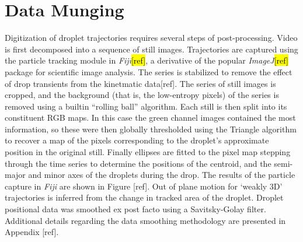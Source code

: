 \documentclass[10pt,a4paper]{article}
\begin{document}
\section{Data Munging}
Digitization of droplet trajectories requires several steps of post-processing. Video is first decomposed into a sequence of still images. Trajectories are captured using the particle tracking module in \emph{Fiji}\hl{[ref]}, a derivative of the popular \emph{ImageJ}\hl{[ref]} package for scientific image analysis. The series is stabilized to remove the effect of drop transients from the kinetmatic data[ref]. The series of still images is cropped, and the background (that is, the low-entropy pixels) of the series is removed using a builtin ``rolling ball'' algorithm. Each still is then split into its constituent RGB maps. In this case the green channel images contained the most information, so these were then globally thresholded using the Triangle algorithm to recover a map of the pixels corresponding to the droplet's approximate position in the original still. Finally ellipses are fitted to the pixel map stepping through the time series to determine the positions of the centroid, and the semi-major and minor axes of the droplets during the drop. The results of the particle capture in \emph{Fiji} are shown in Figure [ref]. Out of plane motion for `weakly 3D' trajectories is inferred from the change in tracked area of the droplet. Droplet positional data was smoothed ex post facto using a Savitsky-Golay filter. Additional details regarding the data smoothing methodology are presented in Appendix [ref].
\end{document}
